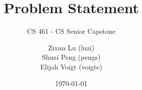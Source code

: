 



\title{Problem Statement}
\subtitle{CS 461 - CS Senior Capstone}
\author{
  Zixun Lu (luzi) \\
  Shuai Peng (pengs) \\Elijah Voigt (voigte)
}
\date{\today}
\maketitle
\begin{abstract}
  
\end{abstract}









